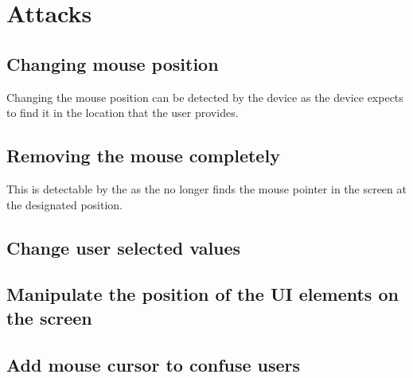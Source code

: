 \section{Attacks}
\label{sec:attacks}

\subsection{Changing mouse position}
Changing the mouse position can be detected by the device as the device expects to find it in the location that the user provides. 
\subsection{Removing the mouse completely}
This is detectable by the \device as the \device no longer finds the mouse pointer in the screen at the designated position.  
\subsection{Change user selected values}
\subsection{Manipulate the position of the UI elements on the screen}
\subsection{Add mouse cursor to confuse users}